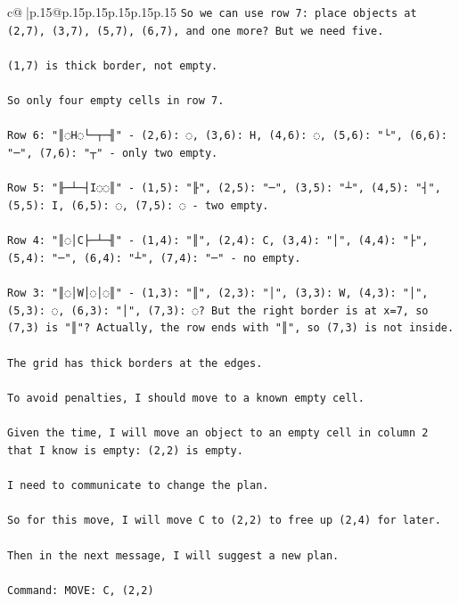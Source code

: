 \documentclass{article}
\begin{document}
{\begin{supertabular}{c@{$\;$}|p{.15\linewidth}@{}p{.15\linewidth}p{.15\linewidth}p{.15\linewidth}p{.15\linewidth}p{.15\linewidth}}
{{{\texttt{So we can use row 7: place objects at (2,7), (3,7), (5,7), (6,7), and one more? But we need five.} \\
\\ 
\texttt{(1,7) is thick border, not empty.} \\
\\ 
\texttt{So only four empty cells in row 7.} \\
\\ 
\texttt{Row 6: "║◌H◌└─┬─╢" {-} (2,6): ◌, (3,6): H, (4,6): ◌, (5,6): "└", (6,6): "─", (7,6): "┬" {-} only two empty.} \\
\\ 
\texttt{Row 5: "╟─┴─┤I◌◌║" {-} (1,5): "╟", (2,5): "─", (3,5): "┴", (4,5): "┤", (5,5): I, (6,5): ◌, (7,5): ◌ {-} two empty.} \\
\\ 
\texttt{Row 4: "║◌│C├─┴─╢" {-} (1,4): "║", (2,4): C, (3,4): "│", (4,4): "├", (5,4): "─", (6,4): "┴", (7,4): "─" {-} no empty.} \\
\\ 
\texttt{Row 3: "║◌│W│◌│◌║" {-} (1,3): "║", (2,3): "│", (3,3): W, (4,3): "│", (5,3): ◌, (6,3): "│", (7,3): ◌? But the right border is at x=7, so (7,3) is "║"? Actually, the row ends with "║", so (7,3) is not inside.} \\
\\ 
\texttt{The grid has thick borders at the edges.} \\
\\ 
\texttt{To avoid penalties, I should move to a known empty cell.} \\
\\ 
\texttt{Given the time, I will move an object to an empty cell in column 2 that I know is empty: (2,2) is empty.} \\
\\ 
\texttt{I need to communicate to change the plan.} \\
\\ 
\texttt{So for this move, I will move C to (2,2) to free up (2,4) for later.} \\
\\ 
\texttt{Then in the next message, I will suggest a new plan.} \\
\\ 
\texttt{Command: MOVE: C, (2,2)} \\
            }
        }
    }
     \\ \\


\end{supertabular}}
\end{document}
